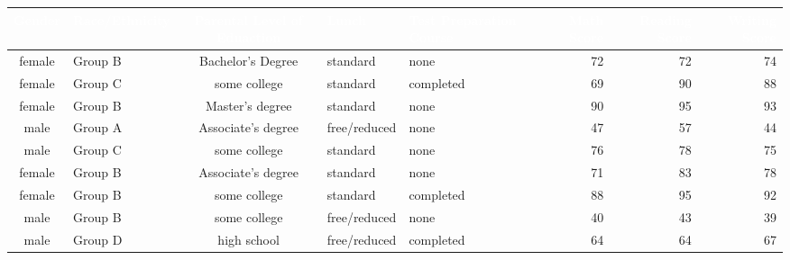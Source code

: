 \documentclass{article}
\begin{document}
	\begin{sidewaystable}[h!]
		\begin{center}
			
	
		\begin{tabular}{|c|l|c|l|l|r|r|r|}
		
		\hline
		
		\rowcolor{blue!65}\textcolor{white}{Gender} & \textcolor{white}{Race/Ethnicity} & \textcolor{white}{Parental Level of Eduaction} & \textcolor{white}{Lunch} & \textcolor{white}{Test Preparation Course} & \textcolor{white}{Math Score} & \textcolor{white}{Reading Score} & \textcolor{white}{Writing Score} \\
		
		\hline
		
		female & Group B & Bachelor's Degree & standard & none & 72 & 72 & 74\\
		
		\hline
		
		female & Group C & some college & standard & completed & 69 & 90 & 88\\
		
		\hline
		
		female & Group B & Master's degree & standard & none & 90 & 95 & 93\\
		
		\hline
		
		male & Group A & Associate's degree & free/reduced & none & 47 & 57 & 44\\
		
		\hline
		
		male & Group C & some college & standard & none & 76 & 78 & 75\\
		
		\hline
		
		female & Group B & Associate's degree & standard & none & 71 & 83 & 78\\
		
		\hline
		
		female & Group B & some college & standard & completed & 88 & 95 & 92\\
		
		\hline
		
		male & Group B & some college & free/reduced & none & 40 & 43 & 39\\
		
		\hline
		
		male & Group D & high school & free/reduced & completed & 64 & 64 & 67\\
		

\end{tabular}
\end{center}
\end{sidewaystable}
\end{document}

